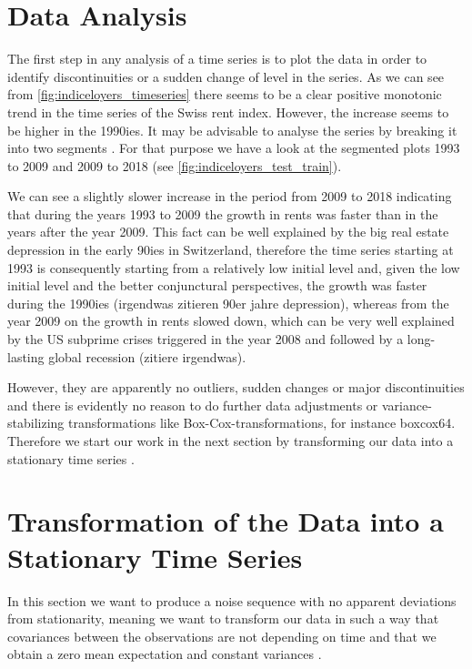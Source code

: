 \documentclass[11pt,a4paper]{article}
\begin{document}

\section{Data Analysis}

The first step in any analysis of a time series is to plot the data in order to identify discontinuities or a sudden change of level in the series\cite[p.~23]{bd02}.
As we can see from \cref{fig:indiceloyers_timeseries} there seems to be a clear positive monotonic trend in the time series of the Swiss rent index.
However, the increase seems to be higher in the 1990ies.
It may be advisable to analyse the series by breaking it into two segments \cite[p.~23]{bd02}.
For that purpose we have a look at the segmented plots 1993 to 2009 and 2009 to 2018 (see \cref{fig:indiceloyers_test_train}).

We can see a slightly slower increase in the period from 2009 to 2018 indicating that during the years 1993 to 2009 the growth in rents was faster than in the years after the year 2009.
This fact can be well explained by the big real estate depression in the early 90ies in Switzerland, therefore the time series starting at 1993 is consequently starting from a relatively low initial level and, given the low initial level and the better conjunctural perspectives, the growth  was faster during the 1990ies (irgendwas zitieren 90er jahre depression), whereas from the year 2009 on the growth in rents slowed down, which can be very well explained by the US subprime crises triggered in the year 2008 and followed by a long-lasting global recession (zitiere irgendwas).

However, they are apparently no outliers, sudden changes or major discontinuities and there is evidently no reason to do further data adjustments or variance-stabilizing transformations like Box-Cox-transformations, for instance {boxcox64}.
Therefore we start our work in the next section by transforming our data into a stationary time series \cite[p.~45--82]{bd02}.



\section{Transformation of the Data into a Stationary Time Series}

In this section we want to produce a noise sequence with no apparent deviations from stationarity, meaning we want to transform our data in such a way that covariances between the observations are not depending on time and that we obtain a zero mean expectation and constant variances \cite[pp.~14--23]{bd02}.
\end{document}
